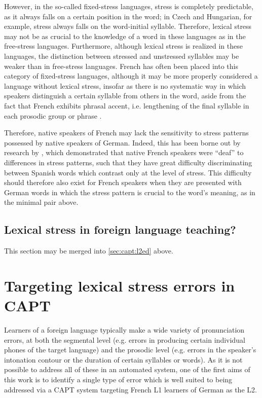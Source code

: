 			However, in the so-called fixed-stress languages, stress is completely predictable, as it always falls on a certain position in the word; in Czech and Hungarian, for example, stress always falls on the word-initial syllable. Therefore, lexical stress may not be as crucial to the knowledge of a word in these languages as in the free-stress languages. Furthermore, although lexical stress is realized in these languages, the distinction between stressed and unstressed syllables may be weaker than in free-stress languages. French has often been placed into this category of fixed-stress languages, although it may be more properly considered a language without lexical stress, insofar as there is no systematic way in which speakers distinguish a certain syllable from others in the word, aside from the fact that French exhibits phrasal accent, i.e. lengthening of the final syllable in each prosodic group or phrase \citep{Dupoux2008}. %
			
		Therefore, native speakers of French may lack the sensitivity to stress patterns possessed by native speakers of German. Indeed, this has been borne out by research by \citeauthor{Dupoux2008} \citep{Peperkamp2002,Dupoux2001,Dupoux2008}, which demonstrated that native French speakers were ``deaf'' to differences in stress patterns, such that they have great difficulty discriminating between Spanish words which contrast only at the level of stress. This difficulty should therefore also exist for French speakers when they are presented with German words in which the stress pattern is crucial to the word's meaning, as in the minimal pair above.
		
		\subsection{Lexical stress in foreign language teaching?}
		\label{sec:stress:l2ed}
		
		This section may be merged into \cref{sec:capt:l2ed} above.
		
		\citep{Hirschfeld2007}
		
		
 \section{Targeting lexical stress errors in CAPT}
 \label{sec:bkgd:targeting}
 	Learners of a foreign language typically make a wide variety of pronunciation errors, at both the segmental level (e.g. errors in producing certain individual phones of the target language) and the prosodic level (e.g. errors in the speaker's intonation contour or the duration of certain syllables or words). As it is not possible to address all of these in an automated system, one of the first aims of this work is to identify a single type of error which is well suited to being addressed via a CAPT system targeting French L1 learners of German as the L2. 
	
